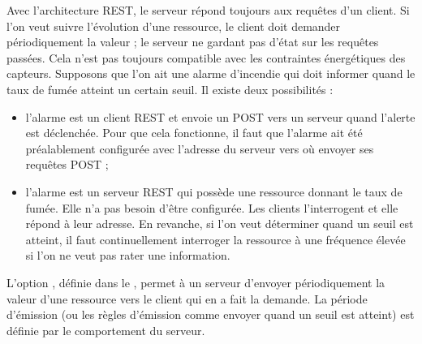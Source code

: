 Avec l’architecture REST, le serveur répond toujours aux requêtes d’un client. Si l'on veut suivre l'évolution d'une ressource, le client doit demander périodiquement la valeur ; le serveur ne gardant pas d'état sur les requêtes passées. Cela n'est pas toujours compatible avec les contraintes énergétiques des capteurs. Supposons que l'on ait une alarme d'incendie qui doit informer quand le taux de fumée atteint un certain seuil. Il existe deux possibilités :
\begin{itemize}
\item l'alarme est un client REST et envoie un POST vers un serveur quand l'alerte est déclenchée. Pour que cela fonctionne, il faut que l'alarme ait été préalablement configurée avec l'adresse du serveur vers où envoyer ses requêtes POST ;
\item l'alarme est un serveur REST qui possède une ressource donnant le taux de fumée. Elle n'a pas besoin d'être configurée. Les clients l'interrogent et elle répond à leur adresse. En revanche, si l'on veut déterminer quand un seuil est atteint, il faut continuellement interroger la ressource à une fréquence élevée si l'on ne veut pas rater une information.
\end{itemize}

         \vspace{1em}

L'option , définie dans le , permet à un serveur d'envoyer périodiquement la valeur d'une ressource vers le client qui en a fait la demande. La période d'émission (ou les règles d'émission comme envoyer quand un seuil est atteint) est définie par le comportement du serveur. 

